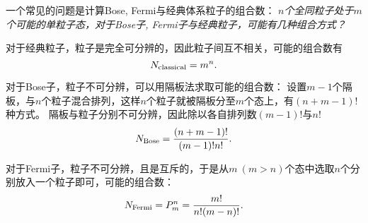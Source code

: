 \begin{tcolorbox}[breakable, colframe=blue, colback=blue!10, title={\textbf{Bose, Fermi与经典体系粒子的组合数计算}}]

    一个常见的问题是计算Bose, Fermi与经典体系粒子的组合数：
    $n$\emph{个全同粒子处于}$m$\emph{个可能的单粒子态，对于Bose子, Fermi子与经典粒子，可能有几种组合方式？}

    对于经典粒子，粒子是完全可分辨的，因此粒子间互不相关，可能的组合数有
    \begin{equation}
        N_{\rm{classical}} = m^n.
    \end{equation}

    对于Bose子，粒子不可分辨，可以用隔板法求取可能的组合数：
    设置$m-1$个隔板，与$n$个粒子混合排列，这样$n$个粒子就被隔板分至$m$个态上，有$(n+m-1)!$种方式。
    隔板与粒子分别不可分辨，因此除以各自排列数$(m-1)!$与$n!$
    \begin{equation}
        N_{\rm{Bose}} = \frac{(n+m-1)!}{(m-1)! n!}.
    \end{equation}

    对于Fermi子，粒子不可分辨，且是互斥的，于是从$m\ (m>n)$个态中选取$n$个分别放入一个粒子即可，可能的组合数：
    \begin{equation}
        N_{\rm{Fermi}} = P_m^n = \frac{m!}{n!(m-n)!}.
    \end{equation}

\end{tcolorbox}
